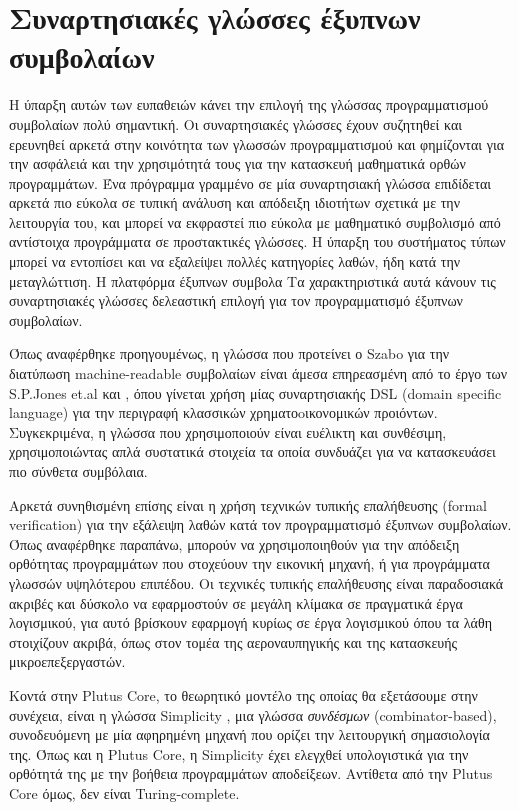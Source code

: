 \section{Συναρτησιακές γλώσσες έξυπνων συμβολαίων} \label{dsls}

Η ύπαρξη αυτών των ευπαθειών κάνει την επιλογή της γλώσσας προγραμματισμού
συμβολαίων πολύ σημαντική. Οι συναρτησιακές γλώσσες έχουν συζητηθεί και
ερευνηθεί αρκετά στην κοινότητα των γλωσσών προγραμματισμού και φημίζονται για
την ασφάλειά και την χρησιμότητά τους για την κατασκευή μαθηματικά ορθών
προγραμμάτων. Ένα πρόγραμμα γραμμένο σε μία συναρτησιακή γλώσσα επιδίδεται
αρκετά πιο εύκολα σε τυπική ανάλυση και απόδειξη ιδιοτήτων σχετικά με την
λειτουργία του, και μπορεί να εκφραστεί πιο εύκολα με μαθηματικό συμβολισμό από
αντίστοιχα προγράμματα σε προστακτικές γλώσσες.  Η ύπαρξη του συστήματος τύπων
μπορεί να εντοπίσει και να εξαλείψει πολλές κατηγορίες λαθών, ήδη κατά την
μεταγλώττιση. Η πλατφόρμα έξυπνων συμβολα Τα χαρακτηριστικά αυτά κάνουν τις
συναρτησιακές γλώσσες δελεαστική επιλογή για τον προγραμματισμό έξυπνων
συμβολαίων.

Όπως αναφέρθηκε προηγουμένως,  η γλώσσα που προτείνει ο Szabo για την διατύπωση
machine-readable συμβολαίων είναι άμεσα επηρεασμένη από το έργο των S.P.Jones
et.al \cite{composingcontracts}  και \cite{howtowriteacontract}, όπου γίνεται
χρήση μίας συναρτησιακής DSL (domain specific language) για την περιγραφή
κλασσικών χρηματοoικονομικών προιόντων. Συγκεκριμένα, η γλώσσα που
χρησιμοποιούν είναι ευέλικτη και συνθέσιμη, χρησιμοποιώντας απλά συστατικά
στοιχεία τα οποία συνδυάζει για να κατασκευάσει πιο σύνθετα συμβόλαια.

Αρκετά συνηθισμένη επίσης είναι η χρήση τεχνικών τυπικής επαλήθευσης (formal
verification) για την εξάλειψη λαθών κατά τον προγραμματισμό έξυπνων
συμβολαίων. Όπως αναφέρθηκε παραπάνω, μπορούν να χρησιμοποιηθούν για την
απόδειξη ορθότητας προγραμμάτων που στοχεύουν την εικονική μηχανή, ή για
προγράμματα γλωσσών υψηλότερου επιπέδου.  Οι τεχνικές τυπικής επαλήθευσης είναι
παραδοσιακά ακριβές και δύσκολο να εφαρμοστούν σε μεγάλη κλίμακα σε πραγματικά
έργα λογισμικού, για αυτό βρίσκουν εφαρμογή κυρίως σε έργα λογισμικού όπου τα
λάθη στοιχίζουν ακριβά, όπως στον τομέα της αεροναυπηγικής και της κατασκευής
μικροεπεξεργαστών.

Κοντά στην Plutus Core, το θεωρητικό μοντέλο της οποίας θα εξετάσουμε στην
συνέχεια, είναι η γλώσσα Simplicity \cite{simplicity}, μια γλώσσα
\emph{συνδέσμων} (combinator-based), συνοδευόμενη με μία αφηρημένη μηχανή που
ορίζει την λειτουργική σημασιολογία της. Όπως και η Plutus Core, η Simplicity
έχει ελεγχθεί υπολογιστικά για την ορθότητά της με την βοήθεια προγραμμάτων
αποδείξεων. Αντίθετα από την Plutus Core όμως, δεν είναι Turing-complete.


